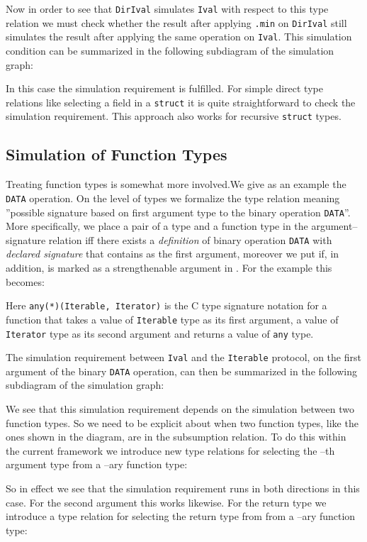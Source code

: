 \documentclass{sigplanconf}
\begin{document}
Now in order to see that \verb+DirIval+ simulates \verb+Ival+ with
respect to this type relation we must check whether the result after
applying \verb+.min+ on \verb+DirIval+ still simulates the result
after applying the same operation on \verb+Ival+. This simulation
condition can be summarized in the following subdiagram of the simulation graph:

In this case the simulation requirement is fulfilled. For simple
direct type relations like selecting a field in a \verb+struct+ it is
quite straightforward to check the simulation requirement. This
approach also works for recursive \verb+struct+ types.

\subsection{Simulation of Function Types}

Treating function types is somewhat more involved.We give as an
example the \verb+DATA+ operation. On the level of types we formalize
the type relation  meaning ''possible signature
based on first argument type to the binary operation \verb+DATA+''.
More specifically, we place a pair  of a type and a function
type in the argument--signature relation  iff there exists a \emph{definition} of binary
operation \verb+DATA+ with \emph{declared signature}  that contains
 as the first argument, moreover we put  if, in addition,  is marked as a
strengthenable argument in . For the example this becomes:

Here \verb-any(*)(Iterable, Iterator)- is the C type signature
notation for a function that takes a value of \verb+Iterable+ type as
its first argument, a value of \verb+Iterator+ type as its second
argument and returns a value of \verb+any+ type.

The simulation requirement between \verb+Ival+ and the \verb+Iterable+
protocol, on the first argument of the binary \verb+DATA+ operation,
can then be summarized in the following subdiagram of the simulation
graph:

We see that this simulation requirement depends on the simulation
between two function types. So we need to be explicit about when two
function types, like the ones shown in the diagram, are in the
subsumption relation. To do this within the current framework we
introduce new type relations  for selecting the
--th argument type from a --ary function type:

So in effect we see that the simulation requirement runs in both
directions in this case. For the second argument this works
likewise. For the return type we introduce a type relation
 for selecting the return type from from a --ary
function type:
\end{document}
